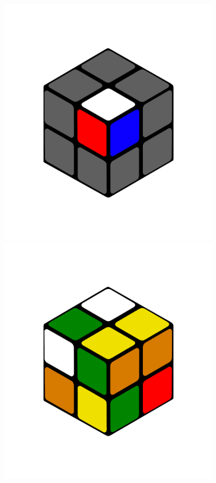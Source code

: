 \documentclass[12pt,a4paper, usenames, dvipsnames]{scrartcl}
\begin{document}
\begin{figure}[h]
\includegraphics[scale=0.04]{2x2stein.png} 
\includegraphics[scale=0.04]{2x2scrambled.png}

\end{figure}
\end{document}
